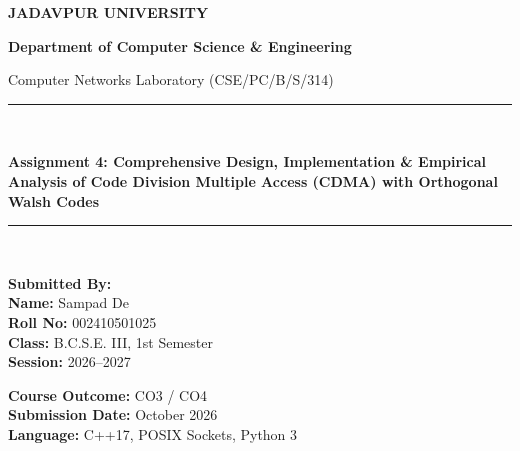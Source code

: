 \documentclass[11pt,a4paper]{article}
\begin{document}
\begin{titlepage}
    \centering
    \vspace*{1.2cm}
    {\huge\bfseries JADAVPUR UNIVERSITY\par}
    \vspace{0.3cm}
    {\Large\bfseries Department of Computer Science \& Engineering\par}
    \vspace{1.0cm}
    {\large Computer Networks Laboratory (CSE/PC/B/S/314)\par}
    \vspace{1.5cm}
    \rule{\linewidth}{0.5mm}\\[0.4cm]
    {\LARGE\bfseries Assignment 4: Comprehensive Design, Implementation \& Empirical Analysis of Code Division Multiple Access (CDMA) with Orthogonal Walsh Codes\par}
    \rule{\linewidth}{0.5mm}\\[2.0cm]

    \begin{minipage}{0.48\textwidth}
        \begin{flushleft} \large
            \textbf{Submitted By:}\\
            \textbf{Name:} Sampad De\\
            \textbf{Roll No:} 002410501025\\
            \textbf{Class:} B.C.S.E. III, 1st Semester\\
            \textbf{Session:} 2026--2027
        \end{flushleft}
    \end{minipage}
    \hfill
    \begin{minipage}{0.48\textwidth}
        \begin{flushright} \large
            \textbf{Course Outcome:} CO3 / CO4\\
            \textbf{Submission Date:} October 2026\\
            \textbf{Language:} C++17, POSIX Sockets, Python 3
        \end{flushright}
    \end{minipage}

    \vfill
\end{titlepage}
\end{document}

